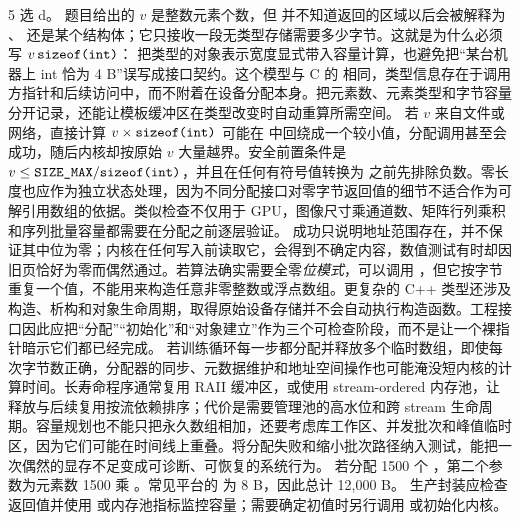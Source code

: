 \begin{solutionexercise}{5}
\conclusionheading 选 d。
\discussionheading
{}
题目给出的 $v$ 是整数元素个数，但  并不知道返回的区域以后会被解释为 、 还是某个结构体；它只接收一段无类型存储需要多少字节。这就是为什么必须写 $v\,\code{sizeof(int)}$： 把类型的对象表示宽度显式带入容量计算，也避免把“某台机器上 int 恰为 4 B”误写成接口契约。这个模型与 C 的  相同，类型信息存在于调用方指针和后续访问中，而不附着在设备分配本身。把元素数、元素类型和字节容量分开记录，还能让模板缓冲区在类型改变时自动重算所需空间。
若 $v$ 来自文件或网络，直接计算 $v\times\code{sizeof(int)}$ 可能在  中回绕成一个较小值，分配调用甚至会成功，随后内核却按原始 $v$ 大量越界。安全前置条件是 $v\le\code{SIZE_MAX}/\code{sizeof(int)}$，并且在任何有符号值转换为  之前先排除负数。零长度也应作为独立状态处理，因为不同分配接口对零字节返回值的细节不适合作为可解引用数组的依据。类似检查不仅用于 GPU，图像尺寸乘通道数、矩阵行列乘积和序列批量容量都需要在分配之前逐层验证。
 成功只说明地址范围存在，并不保证其中位为零；内核在任何写入前读取它，会得到不确定内容，数值测试有时却因旧页恰好为零而偶然通过。若算法确实需要全零\emph{位模式}，可以调用 ，但它按字节重复一个值，不能用来构造任意非零整数或浮点数组。更复杂的 C++ 类型还涉及构造、析构和对象生命周期，取得原始设备存储并不会自动执行构造函数。工程接口因此应把“分配”“初始化”和“对象建立”作为三个可检查阶段，而不是让一个裸指针暗示它们都已经完成。
若训练循环每一步都分配并释放多个临时数组，即使每次字节数正确，分配器的同步、元数据维护和地址空间操作也可能淹没短内核的计算时间。长寿命程序通常复用 RAII 缓冲区，或使用 stream-ordered 内存池，让释放与后续复用按流依赖排序；代价是需要管理池的高水位和跨 stream 生命周期。容量规划也不能只把永久数组相加，还要考虑库工作区、并发批次和峰值临时区，因为它们可能在时间线上重叠。将分配失败和缩小批次路径纳入测试，能把一次偶然的显存不足变成可诊断、可恢复的系统行为。
\variantheading 若分配 1500 个 ，第二个参数为元素数 1500 乘
。常见平台的  为 8 B，因此总计 12,000 B。
\practiceheading 生产封装应检查  返回值并使用  或内存池指标监控容量；需要确定初值时另行调用  或初始化内核。
\end{solutionexercise}

